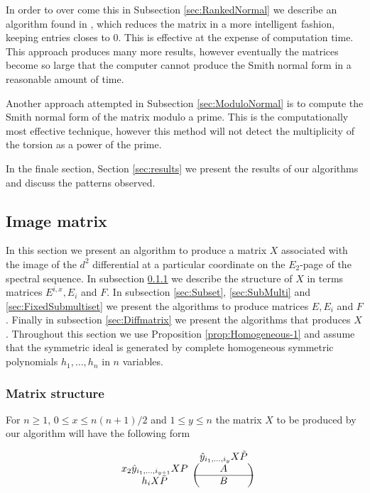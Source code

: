 \documentclass{article}
\theoremstyle{plain}
\theoremstyle{definition}
\numberwithin{thm}{section}
\begin{document}
		In order to over come this in Subsection \ref{sec:RankedNormal}
		we describe an algorithm found in \cite{SmithForm}, which reduces the matrix in a more intelligent fashion, keeping entries closes to $0$.
		This is effective at the expense of computation time.
		This approach produces many more results, 
		however eventually the matrices become so large that the computer cannot produce the Smith normal form in a reasonable amount of time.
		
		Another approach attempted in Subsection \ref{sec:ModuloNormal} is to compute the Smith normal form of the matrix modulo a prime.
		This is the computationally most effective technique, however this method will not detect the multiplicity of the torsion as a power of the prime. 
		
		In the finale section, Section \ref{sec:results} we present the results of our algorithms and discuss the patterns observed.
		
		\subsection{Image matrix}\label{sec:ImageMatrix}
			
			In this section we present an algorithm to produce a matrix $X$ associated with the image of the $d^2$
			differential at a particular coordinate on the $E_2$-page of the spectral sequence.
			In subsection \ref{sec:structure} we describe the structure of $X$ in terms matrices $E^{i,x},E_i$ and $F$.
			In subsection \ref{sec:Subset}, \ref{sec:SubMulti} and \ref{sec:FixedSubmultiset} we present the algorithms to produce matrices $E,E_i$ and $F$.
			Finally in subsection \ref{sec:Diffmatrix} we present the algorithms that produces $X$.
			Throughout this section we use Proposition \ref{prop:Homogeneous-1} and assume that the symmetric ideal is generated by
			complete homogeneous symmetric polynomials $h_1,\dots,h_n$ in $n$ variables.
			
			\subsubsection{Matrix structure}\label{sec:structure}
			
				For $n\geq 1$, $0\leq x\leq n(n+1)/2$ and $1\leq y \leq n$ the matrix $X$ to be produced by our algorithm will have the following form
				
					\[
						\begin{blockarray}{cc}
																									& \hat{y}_{i_1,\dots,i_y}X\tilde{P} \\
							\begin{block}{c(c)}
								x_2\hat{y}_{i_1,\dots,i_{y+1}}XP	& {A}  \\
								\cline{2-2}
								h_iX\bar{P}												& {B}	 \\ 
							\end{block}
						\end{blockarray}
					\]
\end{document}
